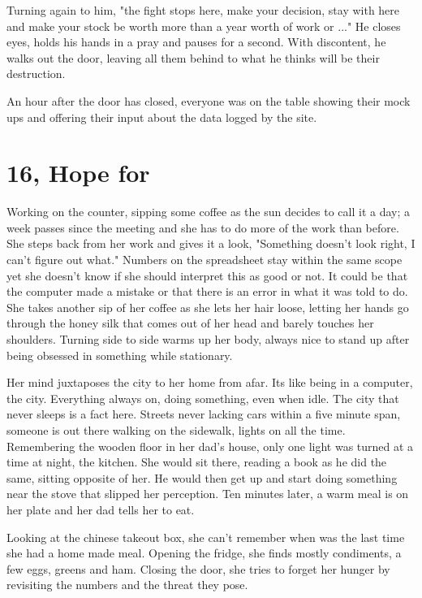         Turning again to him, "the fight stops here, make your decision, stay with here and make your stock be worth more than a year worth
    of work or ..." He closes eyes, holds his hands in a pray and pauses for a second. With discontent, he walks out the door, leaving all them
    behind to what he thinks will be their destruction.

        An hour after the door has closed, everyone was on the table showing their mock ups and offering their input about the data logged by
    the site.

\section{16, Hope for}

        Working on the counter, sipping some coffee as the sun decides to call it a day; a week passes since the meeting and she has to do
    more of the work than before. She steps back from her work and gives it a look, "Something doesn't look right, I can't figure out what."
    Numbers on the spreadsheet stay within the same scope yet she doesn't know if she should interpret this as good or not. It could be that
    the computer made a mistake or that there is an error in what it was told to do. She takes another sip of her coffee as she lets her hair
    loose, letting her hands go through the honey silk that comes out of her head and barely touches her shoulders. Turning side to side
    warms up her body, always nice to stand up after being obsessed in something while stationary.

        Her mind juxtaposes the city to her home from afar. Its like being in a computer, the city. Everything always on, doing something,
    even when idle. The city that never sleeps is a fact here. Streets never lacking cars within a five minute span, someone is out there
    walking on the sidewalk, lights on all the time. Remembering the wooden floor in her dad's house, only one light was turned at a time at
    night, the kitchen. She would sit there, reading a book as he did the same, sitting opposite of her. He would then get up and start
    doing something near the stove that slipped her perception. Ten minutes later, a warm meal is on her plate and her dad tells her to eat.
    
        Looking at the chinese takeout box, she can't remember when was the last time she had a home made meal. Opening the fridge, she finds
    mostly condiments, a few eggs, greens and ham. Closing the door, she tries to forget her hunger by revisiting the numbers and the threat
    they pose.

